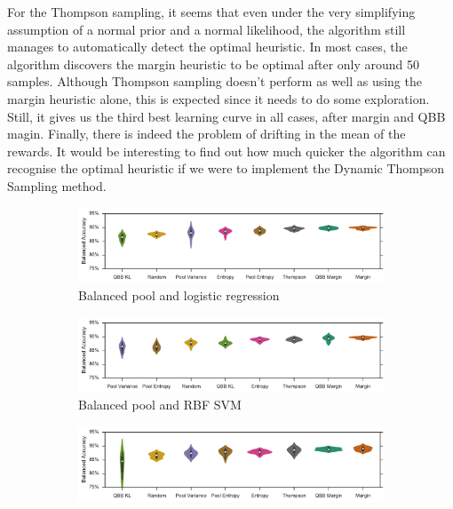 For the Thompson sampling, it seems that even under the very simplifying assumption 
of a normal prior and a normal likelihood, the algorithm still manages to automatically detect
the optimal heuristic. In most cases, the algorithm discovers the margin heuristic to
be optimal after only around 50 samples. Although Thompson sampling doesn't perform as well
as using the margin heuristic alone, this is expected since it needs to do some exploration.
Still, it gives us the third best learning curve in all cases, after margin and QBB magin.
Finally, there is indeed the problem of drifting in the mean of the rewards. It would be
interesting to find out how much quicker the algorithm can recognise the optimal heuristic
if we were to implement the Dynamic Thompson Sampling method.


\begin{figure}[p]
	\centering
	\begin{subfigure}{\textwidth}
		\centering
		\includegraphics[width=\textwidth]{figures/5_active/sdss_bl_ind_violin}
		\caption{Balanced pool and logistic regression}
		\label{fig:sdss_bl_ind_violin}
	\end{subfigure}
	\begin{subfigure}{\textwidth}
		\centering
		\includegraphics[width=\linewidth]{figures/5_active/sdss_br_ind_violin}
		\caption{Balanced pool and RBF SVM}
		\label{fig:sdss_br_ind_violin}
	\end{subfigure}
	\begin{subfigure}{\textwidth}
		\centering
		\includegraphics[width=\textwidth]{figures/5_active/sdss_ul_ind_violin}

\end{subfigure}
\end{figure}
